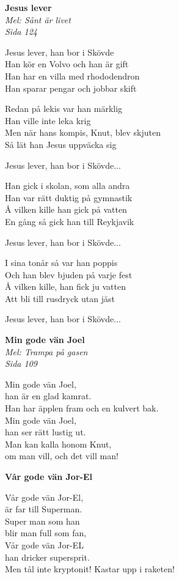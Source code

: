 \documentclass[10pt]{article}
\newenvironment{song}[2]{
	\textbf{#1}\\
	\emph{#2}\par
	\vspace{-1mm}
}{
	\vspace{2mm}
}
\begin{document}
\begin{multicols*}{2}
\begin{song}{Jesus lever}{Mel: Sånt är livet\\Sida 124}
	Jesus lever, han bor i Skövde\\
	Han kör en Volvo och han är gift\\
	Han har en villa med rhododendron\\
	Han sparar pengar och jobbar skift

	Redan på lekis var han märklig\\
	Han ville inte leka krig\\
	Men när hans kompis, Knut, blev skjuten\\
	Så lät han Jesus uppväcka sig

	Jesus lever, han bor i Skövde...

	Han gick i skolan, som alla andra\\
	Han var rätt duktig på gymnastik\\
	Å vilken kille han gick på vatten\\
	En gång så gick han till Reykjavik

	Jesus lever, han bor i Skövde...

	I sina tonår så var han poppis\\
	Och han blev bjuden på varje fest\\
	Å vilken kille, han fick ju vatten\\
	Att bli till rusdryck utan jäst

	Jesus lever, han bor i Skövde...
\end{song}

\vfill
\columnbreak

\begin{song}{Min gode vän Joel}{Mel: Trampa på gasen\\Sida 109\vspace*{-0.2\baselineskip}}
	Min gode vän Joel,\\
	han är en glad kamrat.\\
	Han har äpplen fram och en kulvert bak.\\
	Min gode vän Joel,\\
	han ser rätt lustig ut.\\
	Man kan kalla honom Knut,\\
	om man vill, och det vill man!
\end{song}

\vspace*{-0.2\baselineskip}
\begin{song}{Vår gode vän Jor-El}{\vspace*{-1.2\baselineskip}}
	Vår gode vän Jor-El,\\
	är far till Superman.\\
	Super man som han \\
	blir man full som fan,\\
	Vår gode vän Jor-EL\\
	han dricker supersprit.\\
	Men tål inte kryptonit! Kastar upp i raketen!
\end{song}


\end{multicols*}
\end{document}
